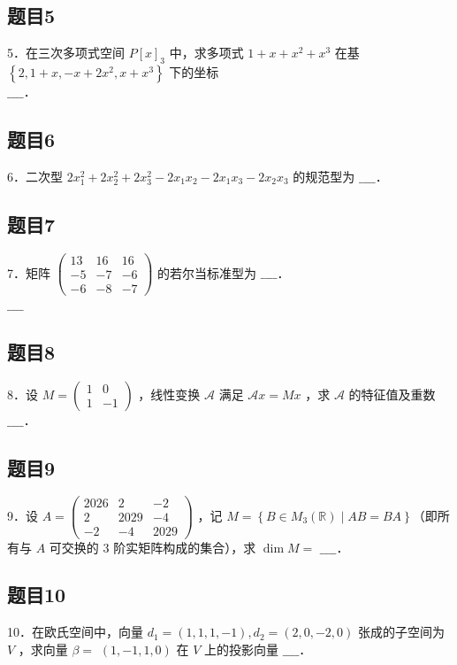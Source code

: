 \documentclass{article}
\begin{document}
\subsection{题目5}
5．在三次多项式空间 \(P[x]_{3}\) 中，求多项式 \(1+x+x^{2}+x^{3}\) 在基 \(\left\{2,1+x,-x+2 x^{2}, x+x^{3}\right\}\) 下的坐标\\
\(\_\_\_\_\)．

\subsection{题目6}
6．二次型 \(2 x_{1}^{2}+2 x_{2}^{2}+2 x_{3}^{2}-2 x_{1} x_{2}-2 x_{1} x_{3}-2 x_{2} x_{3}\) 的规范型为 \(\_\_\_\_\)．

\subsection{题目7}
7．矩阵 \(\left(\begin{array}{rrr}13 & 16 & 16 \\ -5 & -7 & -6 \\ -6 & -8 & -7\end{array}\right)\) 的若尔当标准型为 \(\_\_\_\_\)．\\
\(\_\_\_\_\)

\subsection{题目8}
8．设 \(M=\left(\begin{array}{cc}1 & 0 \\ 1 & -1\end{array}\right)\) ，线性变换 \(\mathcal{A}\) 满足 \(\mathcal{A} x=M x\) ，求 \(\mathcal{A}\) 的特征值及重数 \(\_\_\_\_\)．

\subsection{题目9}
9．设 \(A=\left(\begin{array}{ccc}2026 & 2 & -2 \\ 2 & 2029 & -4 \\ -2 & -4 & 2029\end{array}\right)\) ，记 \(M=\left\{B \in M_{3}(\mathbb{R}) \mid A B=B A\right\}\)（即所有与 \(A\) 可交换的 3 阶实矩阵构成的集合），求 \(\operatorname{dim} M=\) \(\_\_\_\_\)．

\subsection{题目10}
10．在欧氏空间中，向量 \(d_{1}=(1,1,1,-1), d_{2}=(2,0,-2,0)\) 张成的子空间为 \(V\) ，求向量 \(\beta=\) \((1,-1,1,0)\) 在 \(V\) 上的投影向量 \(\_\_\_\_\)．
\end{document}
